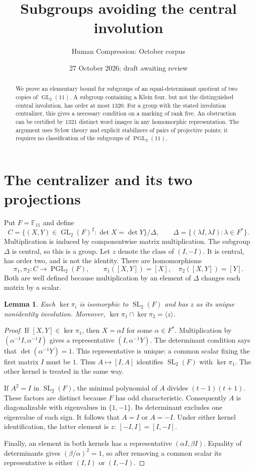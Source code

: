 \documentclass[11pt]{article}
\title{Subgroups avoiding the central involution}
\author{Human Compression: October corpus}
\date{27 October 2026; draft awaiting review}
\newtheorem{lemma}[theorem]{Lemma}
\newcommand{\GL}{\operatorname{GL}}
\newcommand{\SL}{\operatorname{SL}}
\newcommand{\PGL}{\operatorname{PGL}}
\newcommand{\F}{\mathbb F}
\begin{document}
\maketitle
\begin{abstract}
We prove an elementary bound for subgroups of an equal-determinant quotient
of two copies of $\GL_2(11)$. A subgroup containing a Klein four, but not
the distinguished central involution, has order at most $1320$.
For a group with the stated involution centralizer, this gives a necessary
condition on a marking of rank five. An obstruction can be certified by
$1321$ distinct word images in any homomorphic representation. The argument
uses Sylow theory and explicit stabilizers of pairs of projective points;
it requires no classification of the subgroups of $\PGL_2(11)$.
\end{abstract}

\section{The centralizer and its two projections}
Put $F=\F_{11}$ and define
\[
 C=\{(X,Y)\in\GL_2(F)^2:\det X=\det Y\}/\Delta,
 \qquad
 \Delta=\{(\lambda I,\lambda I):\lambda\in F^*\}.
\]
Multiplication is induced by componentwise matrix multiplication. The
subgroup $\Delta$ is central, so this is a group. Let $z$ denote the class
of $(I,-I)$. It is central, has order two, and is not the identity.
There are homomorphisms
\[
 \pi_1,\pi_2:C\longrightarrow\PGL_2(F),\qquad
 \pi_1([X,Y])=[X],\quad\pi_2([X,Y])=[Y].
\]
Both are well defined because multiplication by an element of $\Delta$
changes each matrix by a scalar.

\begin{lemma}\label{lem:kernels}
Each $\ker\pi_i$ is isomorphic to $\SL_2(F)$ and has $z$ as its unique
nonidentity involution. Moreover,
$\ker\pi_1\cap\ker\pi_2=\langle z\rangle$.
\end{lemma}
\begin{proof}
If $[X,Y]\in\ker\pi_1$, then $X=\alpha I$ for some $\alpha\in F^*$.
Multiplication by $(\alpha^{-1}I,\alpha^{-1}I)$ gives a representative
$(I,\alpha^{-1}Y)$. The determinant condition says that
$\det(\alpha^{-1}Y)=1$. This representative is unique: a common scalar
fixing the first matrix $I$ must be $1$. Thus
$A\mapsto[I,A]$ identifies $\SL_2(F)$ with $\ker\pi_1$.
The other kernel is treated in the same way.

If $A^2=I$ in $\SL_2(F)$, the minimal polynomial of $A$ divides
$(t-1)(t+1)$. These factors are distinct because $F$ has odd
characteristic. Consequently $A$ is diagonalizable with eigenvalues in
$\{1,-1\}$. Its determinant excludes one eigenvalue of each sign.
It follows that $A=I$ or $A=-I$. Under either kernel identification,
the latter element is $z$: $[-I,I]=[I,-I]$.

Finally, an element in both kernels has a representative
$(\alpha I,\beta I)$. Equality of determinants gives
$(\beta/\alpha)^2=1$, so after removing a common scalar its representative
is either $(I,I)$ or $(I,-I)$.
\end{proof}
\end{document}
